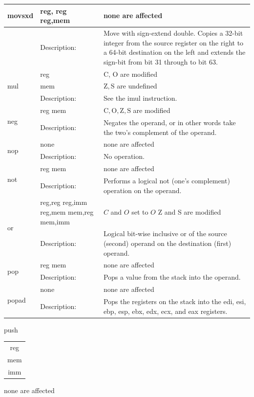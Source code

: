 \documentclass[10pt]{article}
\begin{document}
\begin{center}
\begin{tabular}{|l|l|l|}
\hline
movsxd & reg, reg reg,mem & none are affected \\
\hline
 & Description: & Move with sign-extend double. Copies a 32-bit integer from the source register on the right to a 64-bit destination on the left and extends the sign-bit from bit 31 through to bit 63. \\
\hline
\multirow[t]{3}{*}{mul} & reg & C, O are modified \\
\hline
 & mem & $\mathrm{Z}, \mathrm{S}$ are undefined \\
\hline
 & Description: & See the imul instruction. \\
\hline
\multirow[t]{2}{*}{neg} & reg mem & $\mathrm{C}, \mathrm{O}, \mathrm{Z}, \mathrm{S}$ are modified \\
\hline
 & Description: & Negates the operand, or in other words take the two's complement of the operand. \\
\hline
\multirow[t]{2}{*}{nop} & none & none are affected \\
\hline
 & Description: & No operation. \\
\hline
\multirow[t]{2}{*}{not} & reg mem & none are affected \\
\hline
 & Description: & Performs a logical not (one's complement) operation on the operand. \\
\hline
\multirow[t]{2}{*}{or} & reg,reg reg,imm reg,mem mem,reg mem,imm & $C$ and $O$ set to $O$ Z and S are modified \\
\hline
 & Description: & Logical bit-wise inclusive or of the source (second) operand on the destination (first) operand. \\
\hline
\multirow[t]{2}{*}{pop} & reg mem & none are affected \\
\hline
 & Description: & Pops a value from the stack into the operand. \\
\hline
\multirow[t]{2}{*}{popad} & none & none are affected \\
\hline
 & Description: & Pops the registers on the stack into the edi, esi, ebp, esp, ebx, edx, ecx, and eax registers. \\
\hline
\end{tabular}
\end{center}

push \begin{tabular}{c}
reg \\
mem \\
imm \\
\end{tabular} none are affected
\end{document}
